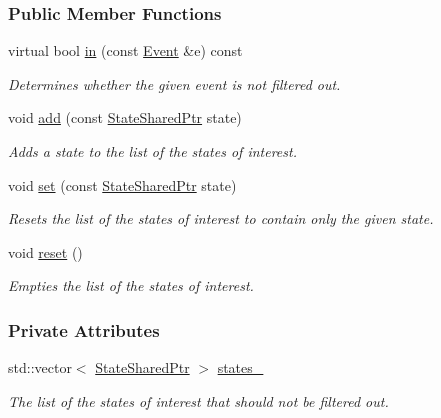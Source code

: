 \subsubsection*{Public Member Functions}
\begin{DoxyCompactItemize}
\item 
virtual bool \hyperlink{structFilterState_a67aec5005fc32e68416d53aabe357148}{in} (const \hyperlink{structFilterBase_a78af2a738ffab6c352d6c4ad0d148a01}{Event} \&e) const 
\begin{DoxyCompactList}\small\item\em Determines whether the given event is not filtered out. \end{DoxyCompactList}\item 
void \hyperlink{structFilterState_ac0c8dc64ed1fa3649ed45ecee12f21bf}{add} (const \hyperlink{structFilterState_a85aec9ba9ba0ef371a8614c5135adc9d}{State\+Shared\+Ptr} state)
\begin{DoxyCompactList}\small\item\em Adds a state to the list of the states of interest. \end{DoxyCompactList}\item 
void \hyperlink{structFilterState_a1e213b031927f5f33205aa07d1e9665f}{set} (const \hyperlink{structFilterState_a85aec9ba9ba0ef371a8614c5135adc9d}{State\+Shared\+Ptr} state)
\begin{DoxyCompactList}\small\item\em Resets the list of the states of interest to contain only the given state. \end{DoxyCompactList}\item 
void \hyperlink{structFilterState_abb82ba34f39fb95225c9ffca0ec2a778}{reset} ()\hypertarget{structFilterState_abb82ba34f39fb95225c9ffca0ec2a778}{}\label{structFilterState_abb82ba34f39fb95225c9ffca0ec2a778}

\begin{DoxyCompactList}\small\item\em Empties the list of the states of interest. \end{DoxyCompactList}\end{DoxyCompactItemize}
\subsubsection*{Private Attributes}
\begin{DoxyCompactItemize}
\item 
std\+::vector$<$ \hyperlink{structFilterState_a85aec9ba9ba0ef371a8614c5135adc9d}{State\+Shared\+Ptr} $>$ \hyperlink{structFilterState_a90c8ca35ddac4663d360e414e976d263}{states\+\_\+}\hypertarget{structFilterState_a90c8ca35ddac4663d360e414e976d263}{}\label{structFilterState_a90c8ca35ddac4663d360e414e976d263}

\begin{DoxyCompactList}\small\item\em The list of the states of interest that should not be filtered out. \end{DoxyCompactList}\end{DoxyCompactItemize}


